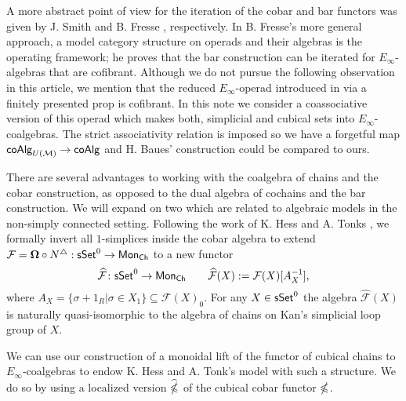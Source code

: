 A more abstract point of view for the iteration of the cobar and bar functors was given by J. Smith \cite{Smith94cobar} and B. Fresse \cite{Fresse10complex}, respectively. 
In B. Fresse's more general approach, a model category structure on operads and their algebras is the operating framework; he proves that the bar construction can be iterated for $E_\infty$-algebras that are cofibrant. Although we do not pursue the following observation in this article, we mention that the reduced $E_\infty$-operad introduced in \cite{Medina20prop1} via a finitely presented prop is cofibrant.
In this note we consider a coassociative version of this operad which makes both, simplicial and cubical sets into $E_\infty$-coalgebras. The strict associativity relation is imposed so we have a forgetful map $\mathsf{coAlg}_{U(\mathcal{M})} \to \mathsf{coAlg}$ and H. Baues' construction could be compared to ours. 


There are several advantages to working with the coalgebra of chains and the cobar construction, as opposed to the dual algebra of cochains and the bar construction.
We will expand on two which are related to algebraic models in the non-simply connected setting.
Following the work of K. Hess and A. Tonks \cite{Hess-Tonks}, we formally invert all $1$-simplices inside the cobar algebra to extend $\mathcal{F}= \mathbf{\Omega} \circ N^{\triangle}: \mathsf{sSet}^0 \to \mathsf{Mon}_{\mathsf{Ch}}$ to a new functor 
\begin{equation*}
\widehat{\mathcal{F}} \colon \mathsf{sSet}^0 \to \mathsf{Mon}_{\mathsf{Ch}}
\qquad
\widehat{\mathcal{F}}( X):= \mathcal{F}(X)[A_X^{-1}],
\end{equation*}
where $A_X=\{ \sigma +1_R | \sigma \in X_1\}\subseteq \mathcal{F}(X)_0$. For any $X \in \mathsf{sSet}^0$ the algebra $\widehat{\mathcal{F}}(X)$ is naturally quasi-isomorphic to the algebra of chains on Kan's simplicial loop group of $X$.



We can use our construction of a monoidal lift of the functor of cubical chains to $E_\infty$-coalgebras to endow K. Hess and A. Tonk's model with such a structure. We do so by using a localized version $\widehat {\mathbb{\Omega}}$ of the cubical cobar functor $\mathbb{\Omega}$.

